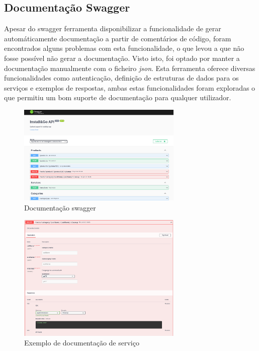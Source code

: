 \newpage

\subsection{Documentação Swagger}
Apesar do swagger ferramenta disponibilizar a funcionalidade de gerar automáticamente documentação a partir de comentários de código, foram encontrados alguns problemas com esta funcionalidade, o que levou a que não fosse possível não gerar a documentação. Visto isto, foi optado por manter a documentação manualmente com o ficheiro \textit{json}. Esta ferramenta oferece diversas funcionalidades como autenticação, definição de estruturas de dados para os serviços e exemplos de respostas, ambas estas funcionalidades foram exploradas o que permitiu um bom suporte de documentação para qualquer utilizador.

\begin{figure}[htb]
  \centering
  \includegraphics[width=0.7\textwidth]{images/implementacao/api/swagger_intro.png}
  \caption{Documentação swagger}
  \label{fig:67}
\end{figure}

\begin{figure}[htb]
  \centering
  \includegraphics[width=0.7\textwidth]{images/implementacao/api/swagger_pedido.png}
  \caption{Exemplo de documentação de serviço}
  \label{fig:68}
\end{figure}